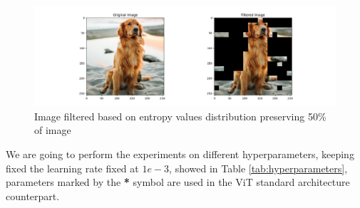     \begin{figure}[!htp]
        \centering
        \includegraphics[width=\columnwidth]{images/dog_entropy.png}
        \caption{Image filtered based on entropy values distribution preserving 50\% of image}
        \label{fig:dog_entropy}
    \end{figure}
    
We are going to perform the experiments on different hyperparameters, keeping fixed the learning rate fixed at $1e-3$, showed in Table \ref{tab:hyperparameters}, parameters marked by the \textbf{*} symbol are used in the ViT standard architecture counterpart.
